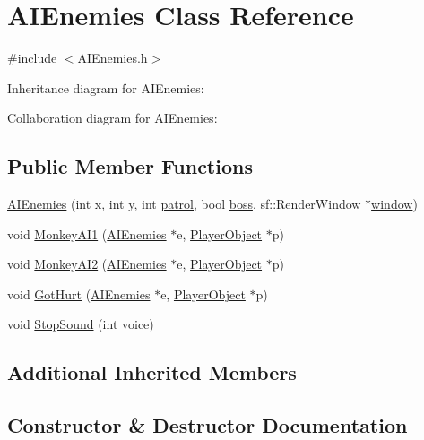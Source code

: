\hypertarget{classAIEnemies}{}\section{A\+I\+Enemies Class Reference}
\label{classAIEnemies}


{\ttfamily \#include $<$A\+I\+Enemies.\+h$>$}



Inheritance diagram for A\+I\+Enemies\+:


Collaboration diagram for A\+I\+Enemies\+:
\subsection*{Public Member Functions}
\begin{DoxyCompactItemize}
\item 
\hyperlink{classAIEnemies_a5a5422b74b8f380bc5c34b52b8476bd2}{A\+I\+Enemies} (int x, int y, int \hyperlink{classAI_ac28e1dce23ebfb9beb0542ddd46ec3da}{patrol}, bool \hyperlink{classAI_a1fa0702b9e1c4b6a29227dfc6e58be46}{boss}, sf\+::\+Render\+Window $\ast$\hyperlink{classAI_a0484a23ffd7e5c09b7fc252350a2c8c4}{window})
\item 
void \hyperlink{classAIEnemies_a41072a42186c477dd7cfcb888e68f468}{Monkey\+A\+I1} (\hyperlink{classAIEnemies}{A\+I\+Enemies} $\ast$e, \hyperlink{classPlayerObject}{Player\+Object} $\ast$p)
\item 
void \hyperlink{classAIEnemies_a0df974288fb844f4fc164c9e3f1840d1}{Monkey\+A\+I2} (\hyperlink{classAIEnemies}{A\+I\+Enemies} $\ast$e, \hyperlink{classPlayerObject}{Player\+Object} $\ast$p)
\item 
void \hyperlink{classAIEnemies_a66cc890d3f5a49eee27432a13ccca93c}{Got\+Hurt} (\hyperlink{classAIEnemies}{A\+I\+Enemies} $\ast$e, \hyperlink{classPlayerObject}{Player\+Object} $\ast$p)
\item 
void \hyperlink{classAIEnemies_a151dd7b9b18ea310baf8978813d64d44}{Stop\+Sound} (int voice)
\end{DoxyCompactItemize}
\subsection*{Additional Inherited Members}


\subsection{Constructor \& Destructor Documentation}
